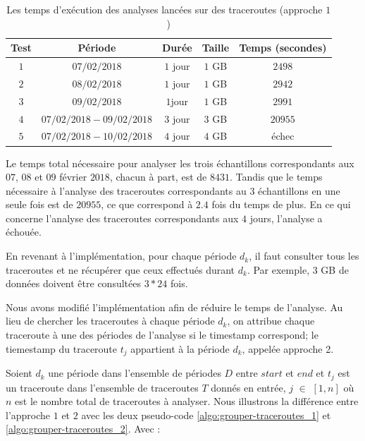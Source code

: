 \begin{table}[H]
\centering
\captionsetup{justification=centering}
	\begin{tabular}{c cccc}
		
		\textbf{Test}&\textbf{Période} &\textbf{Durée}  & \textbf{Taille}   & \textbf{Temps (secondes)} \\ \hline
		
		$ 1 $&$ 07/02/2018 $&$ 1 $ jour&$ 1 $ GB& $ 2498 $\\ \hline
		$ 2 $&$ 08/02/2018 $&$ 1 $ jour&$ 1 $ GB& $ 2942 $\\ \hline
	$ 	3 $&$ 09/02/2018 $&$ 1  $jour& $ 1 $ GB& $ 2991 $\\ \hline
		$ 4 $&$ 07/02/2018 - 09/02/2018 $&$ 3 $ jour& $ 3 $ GB& $ 20955 $\\ \hline
		$ 5 $&$ 07/02/2018 - 10/02/2018 $&$ 4 $ jour& $ 4 $ GB & échec \\ \hline
	\end{tabular}
	\caption{Les temps d'exécution des analyses lancées sur des traceroutes (approche $1$)}
	\label{tab:spark-timing}
\end{table}

Le temps total nécessaire pour analyser les trois échantillons correspondants aux  $ 07 $, $ 08 $ et $ 09 $ février $ 2018 $, chacun à part,  est de $ 8431 $. Tandis que le temps nécessaire à l'analyse des traceroutes correspondants au 3 échantillons en une seule fois est de $20955$, ce que correspond à $ 2.4 $ fois du temps de plus.
En ce qui concerne l'analyse des traceroutes correspondants aux $ 4 $ jours,  l'analyse a échouée. 

En revenant à l'implémentation, pour chaque période $d_k$, il faut consulter tous les traceroutes et ne récupérer que ceux effectués durant $d_k$. Par exemple, 3 GB de données doivent être consultées $ 3 * 24 $ fois. 


Nous avons modifié l'implémentation afin de réduire le temps de l'analyse. Au lieu de chercher les traceroutes à chaque période $d_k$,  on attribue chaque traceroute à une des périodes de l'analyse si le timestamp correspond; le tiemestamp du traceroute $t_{j}$ appartient à la période $d_k$, appelée approche 2.


Soient $d_k$ une période dans l'ensemble de périodes $D$  entre $ start $ et $ end $ et $t_{j}$ est un traceroute dans l'ensemble de traceroutes $T$ donnés en entrée, $j$ $\in$ $[1, n]$ où $n$ est le nombre total de traceroutes à analyser. Nous illustrons la différence entre l'approche $ 1 $ et $ 2 $ avec les deux pseudo-code \ref{algo:grouper-traceroutes_1} et 	\ref{algo:grouper-traceroutes_2}. Avec :

